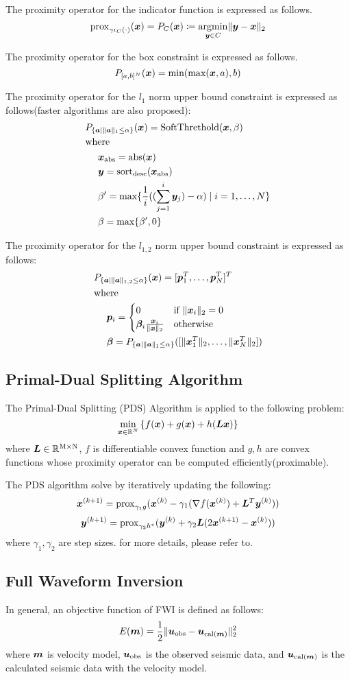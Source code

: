 The proximity operator for the indicator function is expressed as follows.
\begin{equation} \label{eq:ProximityOperatorDefinitionWithIndicatorFunctionEq}
\proximityOperator{ \gamma \indicatorFunction{C}{\cdot} }{\vecx} = P_C(\vecx) \coloneq \argmin{\vecy \in C} \LTwoNorm{\vecy - \vecx}
\end{equation}

The proximity operator for the box constraint is expressed as follows.
\begin{equation} \label{eq:ProximityOperatorForBoxConstraint} \projBoxSolution \end{equation}

The proximity operator for the $l_1$ norm upper bound constraint is expressed as follows\cite{L1-ball-projection}(faster algorithms are also proposed\cite{fast-L1-ball-projection}):
\begin{equation} \label{eq:ProximityOperatorForL1Ball}  \projLOneBallSolution \end{equation}

The proximity operator for the $l_{1,2}$ norm upper bound constraint is expressed as follows\cite{L12-ball-projection}:
\begin{equation} \label{eq:ProximityOperatorForL12Ball} \projLOneTwoBallSolution \end{equation}

\subsection{Primal-Dual Splitting Algorithm}\label{subsec:primal-dual-splitting-algorithm}
The Primal-Dual Splitting (PDS) Algorithm\cite{PDS0,PDS1,PDS2,PDS3} is applied to the following problem:
\begin{equation} \label{eq:PDSPrimalEq} \PDSPrimal \end{equation}
where $\bm{L} \in \realNumber^{\intM \times \intN}$, $f$ is differentiable convex function and $g,h$ are convex functions whose proximity operator can be computed efficiently(proximable).

The PDS algorithm solve by iteratively updating the following:
\begin{equation} \label{eq:PDSSubStepX} \PDSSubStepX \end{equation}
\begin{equation} \label{eq:PDSSubStepY} \PDSSubStepY \end{equation}
where $\gamma_1, \gamma_2$ are step sizes.
for more details, please refer to\cite{PDS2}.

\subsection{Full Waveform Inversion}\label{subsec:full-waveform-inversion}
In general, an objective function of FWI is defined as follows:
\begin{equation} \label{eq:FWIObjective} \FWIObjectiveDefinition \end{equation}
where $\velModel$ is velocity model, $\seismicData_{\mathrm{obs}}$ is the observed seismic data, and $\seismicData_{\mathrm{cal}(\velModel)}$ is the calculated seismic data with the velocity model.
